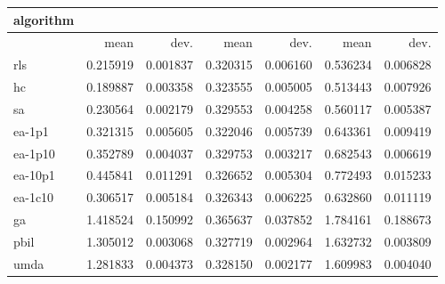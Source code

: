 \begin{tabular}{@{}l*{6}{>{{}}N{1}{2}}@{}}
\toprule
{algorithm} &  &  &  \\
\midrule
& {mean} & {dev.} & {mean} & {dev.} & {mean} & {dev.} \\
\midrule
rls & 0.215919 & 0.001837 & 0.320315 & 0.006160 & 0.536234 & 0.006828 \\
 hc & 0.189887 & 0.003358 & 0.323555 & 0.005005 & 0.513443 & 0.007926 \\
 sa & 0.230564 & 0.002179 & 0.329553 & 0.004258 & 0.560117 & 0.005387 \\
 ea-1p1 & 0.321315 & 0.005605 & 0.322046 & 0.005739 & 0.643361 & 0.009419 \\
 ea-1p10 & 0.352789 & 0.004037 & 0.329753 & 0.003217 & 0.682543 & 0.006619 \\
 ea-10p1 & 0.445841 & 0.011291 & 0.326652 & 0.005304 & 0.772493 & 0.015233 \\
 ea-1c10 & 0.306517 & 0.005184 & 0.326343 & 0.006225 & 0.632860 & 0.011119 \\
 ga & 1.418524 & 0.150992 & 0.365637 & 0.037852 & 1.784161 & 0.188673 \\
 pbil & 1.305012 & 0.003068 & 0.327719 & 0.002964 & 1.632732 & 0.003809 \\
 umda & 1.281833 & 0.004373 & 0.328150 & 0.002177 & 1.609983 & 0.004040 \\
 \bottomrule
\end{tabular}
